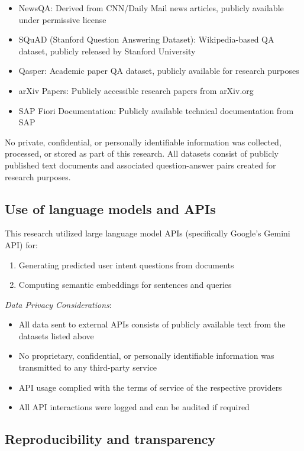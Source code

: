 \documentclass[12pt,a4paper]{report}
\begin{document}
\begin{itemize}
\item NewsQA: Derived from CNN/Daily Mail news articles, publicly available under permissive license
\item SQuAD (Stanford Question Answering Dataset): Wikipedia-based QA dataset, publicly released by Stanford University
\item Qasper: Academic paper QA dataset, publicly available for research purposes
\item arXiv Papers: Publicly accessible research papers from arXiv.org
\item SAP Fiori Documentation: Publicly available technical documentation from SAP
\end{itemize}

No private, confidential, or personally identifiable information was collected, processed, or stored as part of this research. All datasets consist of publicly published text documents and associated question-answer pairs created for research purposes.

\subsection{Use of language models and APIs}

This research utilized large language model APIs (specifically Google's Gemini API) for:
\begin{enumerate}
\item Generating predicted user intent questions from documents
\item Computing semantic embeddings for sentences and queries
\end{enumerate}

\emph{Data Privacy Considerations}:
\begin{itemize}
\item All data sent to external APIs consists of publicly available text from the datasets listed above
\item No proprietary, confidential, or personally identifiable information was transmitted to any third-party service
\item API usage complied with the terms of service of the respective providers
\item All API interactions were logged and can be audited if required
\end{itemize}

\subsection{Reproducibility and transparency}
\end{document}
